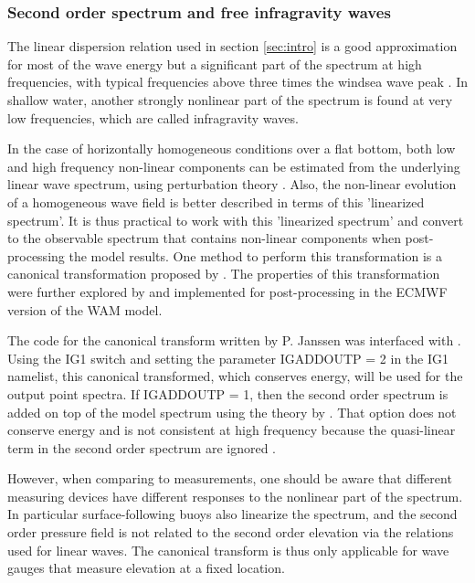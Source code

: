 \vsssub
\subsubsection{Second order spectrum and free infragravity waves} \label{sec:IG1}
\vsssub


\noindent 
The linear dispersion relation used in section  \ref{sec:intro} is a good approximation 
for most of the wave energy but a significant part of the spectrum at high frequencies, 
with typical frequencies above three times the windsea wave peak \citep[e.g.][]{rep:Leckler2013}. 
In shallow water, another strongly nonlinear part of the spectrum is found at very low 
frequencies, which are called infragravity waves. 

In the case of horizontally homogeneous conditions over a flat bottom, both low and high frequency 
non-linear components can be estimated from the underlying linear wave spectrum, using 
perturbation theory \citep[e.g.][]{art:Has62}. Also, the non-linear evolution of a homogeneous 
wave field is better described in terms of this 'linearized spectrum'. It is thus practical 
to work with this 'linearized spectrum' and convert to the observable spectrum that contains 
non-linear components when post-processing the model results. One method to perform this 
transformation is a canonical transformation proposed by \cite{art:Kra94}. The 
properties of this transformation were further explored by \cite{art:Jan09} and implemented 
for post-processing in the ECMWF version of the WAM model. 

The code for the canonical transform written by P. Janssen was interfaced with \ws. 
Using the IG1 switch and setting the parameter IGADDOUTP = 2 in the IG1 namelist, this canonical 
transformed, which conserves energy, will be used for the output point spectra. 
If IGADDOUTP = 1, then the second order spectrum is added on top of the model spectrum using 
the theory by \citep[e.g.][]{art:Has62}. That option does not conserve energy and is not consistent 
at high frequency because the quasi-linear term in the second order spectrum are ignored  \citep{art:Jan09}. 

However, when comparing to measurements, one should be aware that different 
measuring devices have different responses to the nonlinear part of the spectrum. In particular
surface-following buoys also linearize the spectrum, and the second order 
pressure field is not related to the second order elevation via the relations used for 
linear waves. The canonical transform is thus only applicable for wave gauges that measure elevation 
at a fixed location. 

